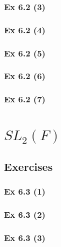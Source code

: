 \subsubsection{Ex 6.2 (3)}\label{sec:Ex_6.2.3}

\subsubsection{Ex 6.2 (4)}\label{sec:Ex_6.2.4}

\subsubsection{Ex 6.2 (5)}\label{sec:Ex_6.2.5}

\subsubsection{Ex 6.2 (6)}\label{sec:Ex_6.2.6}

\subsubsection{Ex 6.2 (7)}\label{sec:Ex_6.2.7}

\newpage		%

\section{$SL_2(F)$}\label{sec:6.3}
\subsection{Exercises}\label{sec:6.3_Exercises}

\subsubsection{Ex 6.3 (1)}\label{sec:Ex_6.3.1}

\subsubsection{Ex 6.3 (2)}\label{sec:Ex_6.3.2}

\subsubsection{Ex 6.3 (3)}\label{sec:Ex_6.3.3}

